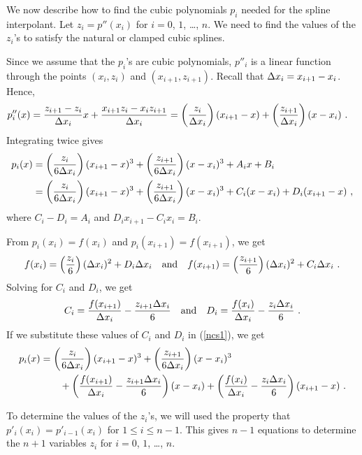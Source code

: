 We now describe how to find the cubic polynomials $p_i$ needed for the 
spline interpolant.  Let $z_i = p''(x_i)$ for $i=0$, $1$, \ldots, $n$.  
We need to find the values of the $z_i$'s to satisfy the natural or
clamped cubic splines.

Since we assume that the $p_i$'s are cubic polynomials, $p''_i$ is a
linear function through the points $(x_i,z_i)$ and
$(x_{i+1}, z_{i+1})$.  Recall that $\Delta{x_i} = x_{i+1} - x_i$.  Hence, 
\begin{align*}
p''_i(x) &= \frac{z_{i+1}-z_i}{\Delta{x_i}} x +
\frac{x_{i+1}z_i-x_i z_{i+1}}{\Delta{x_i}}
= \left(\frac{z_i}{\Delta{x_i}}\right) (x_{i+1}-x)
+ \left(\frac{z_{i+1}}{\Delta{x_i}}\right) (x-x_i) \ .
\end{align*}
Integrating twice gives
\begin{align}
p_i(x) &= \left(\frac{z_i}{6 \Delta{x_i}}\right) (x_{i+1}-x)^3
+ \left(\frac{z_{i+1}}{6 \Delta{x_i}}\right) (x-x_i)^3
+ A_i x + B_i \nonumber \\
&= \left(\frac{z_i}{6 \Delta{x_i}}\right) (x_{i+1}-x)^3
+ \left(\frac{z_{i+1}}{6 \Delta{x_i}}\right) (x-x_i)^3
+ C_i (x - x_i) + D_i (x_{i+1}-x) \ , \label{ncs1}
\end{align}
where $C_i-D_i=A_i$ and $D_i x_{i+1} - C_i x_i = B_i$.

From $p_i(x_i) = f(x_i)$ and $p_i(x_{i+1}) = f(x_{i+1})$, we get
\[
f(x_i) = \left(\frac{z_i}{6}\right) (\Delta{x_i})^2
+ D_i \Delta{x_i}
\quad \text{and} \quad
f(x_{i+1}) = \left(\frac{z_{i+1}}{6}\right) (\Delta{x_i})^2
+ C_i \Delta{x_i} \ .
\]
Solving for $C_i$ and $D_i$, we get
\[
C_i = \frac{f(x_{i+1})}{\Delta{x_i}} - \frac{z_{i+1}\Delta{x_i}}{6}
\quad \text{and} \quad
D_i = \frac{f(x_i)}{\Delta{x_i}}-\frac{z_i \Delta{x_i}}{6} \ .
\]
If we substitute these values of $C_i$ and $D_i$ in (\ref{ncs1}), we
get
\begin{equation} \label{ncs2}
\begin{split}
p_i(x) &= \left(\frac{z_i}{6 \Delta{x_i}}\right) (x_{i+1}-x)^3
+ \left(\frac{z_{i+1}}{6 \Delta{x_i}}\right) (x-x_i)^3 \\
&\qquad + \left(\frac{f(x_{i+1})}{\Delta{x_i}}
-\frac{z_{i+1} \Delta{x_i}}{6}\right)(x-x_i)
+ \left( \frac{f(x_i)}{\Delta{x_i}}-\frac{z_i \Delta{x_i}}{6}\right)
(x_{i+1}-x) \ .
\end{split}
\end{equation}

To determine the values of the $z_i$'s, we will used the property that
$p'_i(x_i) = p'_{i-1}(x_i)$ for $1\leq i \leq n-1$.  This gives $n-1$
equations to determine the $n+1$ variables $z_i$ for $i=0$, $1$,
\ldots, $n$.


